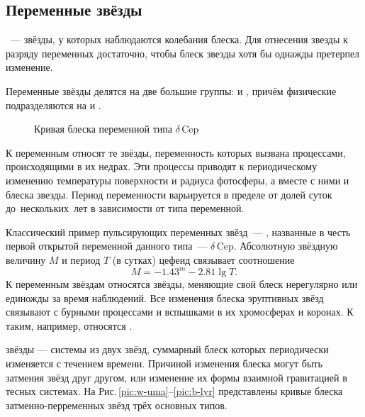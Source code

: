 \subsection{Переменные звёзды}
~--- звёзды, у которых наблюдаются колебания блеска.   Для отнесения звезды к разряду переменных достаточно, чтобы блеск звезды хотя бы однажды претерпел изменение.

Переменные звёзды делятся на две большие группы:  и , причём физические подразделяются на  и .

\begin{wrapfigure}[11]{l}{0.5\tw}
	\centering
 	\caption{Кривая блеска переменной типа $\delta$\,Cep}
 	\label{pic:d-cep}
\end{wrapfigure}
К  переменным  относят те звёзды, переменность которых вызвана процессами, происходящими в их недрах. Эти процессы приводят к периодическому изменению температуры поверхности и радиуса фотосферы, а вместе с ними и блеска звезды. Период переменности варьируется в пределе от долей суток до~нескольких~лет в зависимости от типа переменной. 

Классический пример пульсирующих переменных звёзд~--- , названные в честь первой открытой переменной данного типа~--- $\delta$\,Cep. Абсолютную звёздную величину $M$ и период $T$ (в сутках) цефеид связывает соотношение
\begin{equation}
	M = -1.43^m - 2.81\lg T.
\end{equation}
К  переменным звёздам относятся звёзды, меняющие свой блеск нерегулярно или единожды за время наблюдений. Все изменения блеска эруптивных звёзд связывают с бурными процессами и вспышками в их хромосферах и коронах. К таким, например, относятся .

 звёзды --- системы из двух звёзд, суммарный блеск которых периодически изменяется с течением времени. Причиной изменения блеска могут быть затмения звёзд друг другом, или изменение их формы взаимной гравитацией в тесных системах. На Рис.\,\ref{pic:w-uma}--\ref{pic:b-lyr}  представлены кривые блеска затменно-перременных звёзд трёх основных типов.

